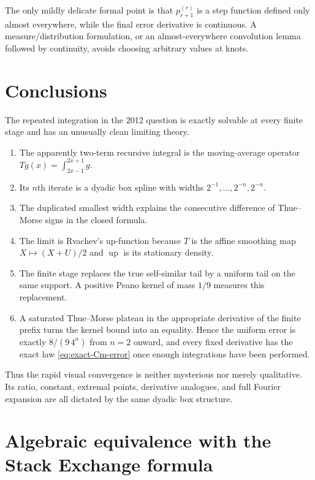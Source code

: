 \documentclass[11pt,oneside]{article}
\theoremstyle{definition}
\theoremstyle{remark}
\newcommand{\Up}{\operatorname{up}}
\begin{document}
The only mildly delicate formal point is that $p_{r+1}^{(r)}$ is a step function defined only
almost everywhere, while the final error derivative is continuous.  A measure/distribution
formulation, or an almost-everywhere convolution lemma followed by continuity, avoids choosing
arbitrary values at knots.

\section{Conclusions}
\label{sec:conclusion}

The repeated integration in the 2012 question is exactly solvable at every finite stage and
has an unusually clean limiting theory.

\begin{enumerate}
\item The apparently two-term recursive integral is the moving-average operator
      $Tg(x)=\int_{2x-1}^{2x+1}g$.
\item Its $n$th iterate is a dyadic box spline with widths
      $2^{-1},\ldots,2^{-n},2^{-n}$.
\item The duplicated smallest width explains the consecutive difference of Thue--Morse signs
      in the closed formula.
\item The limit is Rvachev's up-function because $T$ is the affine smoothing map
      $X\mapsto(X+U)/2$ and $\Up$ is its stationary density.
\item The finite stage replaces the true self-similar tail by a uniform tail on the same
      support.  A positive Peano kernel of mass $1/9$ measures this replacement.
\item A saturated Thue--Morse plateau in the appropriate derivative of the finite prefix turns
      the kernel bound into an equality.  Hence the uniform error is exactly
      $8/(9\,4^n)$ from $n=2$ onward, and every fixed derivative has the exact law
      \eqref{eq:exact-Cm-error} once enough integrations have been performed.
\end{enumerate}

Thus the rapid visual convergence is neither mysterious nor merely qualitative.  Its ratio,
constant, extremal points, derivative analogues, and full Fourier expansion are all dictated
by the same dyadic box structure.

\appendix

\section{Algebraic equivalence with the Stack Exchange formula}
\label{app:equivalence}
\end{document}
